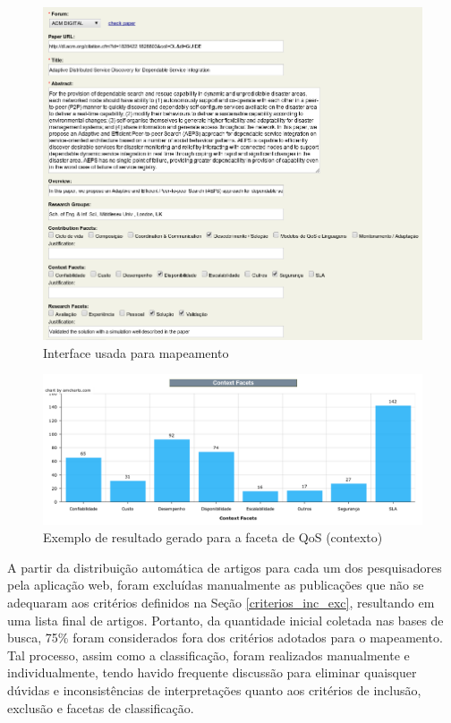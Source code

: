 \begin{figure}[htb]
\centering
\includegraphics[scale=0.29]{figuras/Support_Tool_01.png}
\caption{Interface usada para mapeamento}
\label{fig:support_tool_01}
\end{figure}

\begin{figure}[htb]
\centering
\includegraphics[scale=0.23]{figuras/Support_Tool_03.png}
\caption{Exemplo de resultado gerado para a faceta de QoS (contexto)}
\label{fig:support_tool_03}
\end{figure}

A partir da distribuição automática de artigos para cada um dos pesquisadores pela aplicação web, foram excluídas manualmente as publicações que não se adequaram aos critérios definidos na Seção \ref{criterios_inc_exc}, resultando em uma lista final de \AcceptedPubs artigos. Portanto, da quantidade inicial coletada nas bases de busca, 75\% foram considerados fora dos critérios adotados para o mapeamento. Tal processo, assim como a classificação, foram realizados manualmente e individualmente, tendo havido frequente discussão para eliminar quaisquer dúvidas e inconsistências de interpretações quanto aos critérios de inclusão, exclusão e facetas de classificação. 

